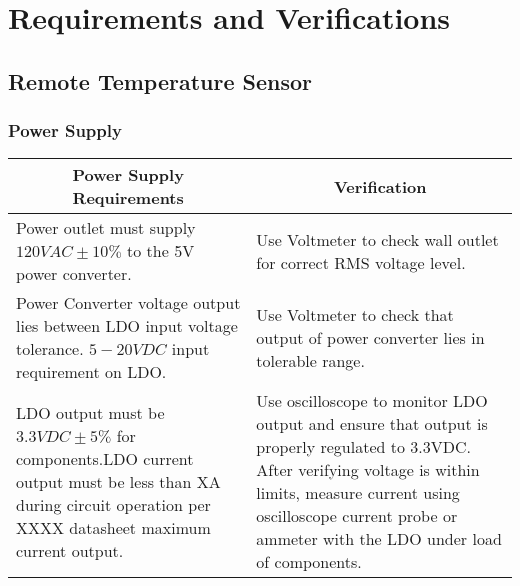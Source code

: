 \section{Requirements and Verifications}
\subsection{Remote Temperature Sensor}
\subsubsection{Power Supply}
\begin{tabular}{|p{}|p{}|}
\hline
\multicolumn{1}{|c|}{Power Supply Requirements} & \multicolumn{1}{|c|}{Verification} \\
\hline\hline
Power outlet must supply $120VAC \pm 10\%$ to the 5V power converter. & Use Voltmeter to check wall outlet for correct RMS voltage level.\\
\hline
Power Converter voltage output lies between LDO input voltage tolerance. $5-20VDC$ input requirement on LDO. & Use Voltmeter to check that output of power converter lies in tolerable range.\\
\hline
LDO output must be $3.3VDC \pm 5\%$ for components.\newline LDO current output must be less than XA during circuit operation per XXXX datasheet maximum current output. & Use oscilloscope to monitor LDO output and ensure that output is properly regulated to 3.3VDC.  After verifying voltage is within limits, measure current using oscilloscope current probe or ammeter with the LDO under load of components.\\
\hline
\end{tabular}

